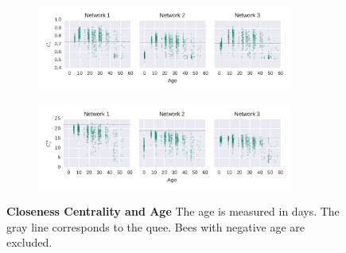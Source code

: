 \begin{figure}[htb]
	\centering
	\begin{subfigure}[b]{1.0\textwidth}
	\centering
	\includegraphics[width=0.92\textwidth]{Figures/stat-closenessAge}
	\label{fig:closenessAgeUW}
	\end{subfigure} 
	\begin{subfigure}[b]{1.0\textwidth}
	\centering
	\includegraphics[width=0.92\textwidth]{Figures/stat-closenessWAge}
	\label{fig:closenessAgeW}
	\end{subfigure}
	\caption[Closeness Centrality and Age]{\textbf{Closeness Centrality and Age} The age is measured in days. The gray line corresponds to the quee. Bees with negative age are excluded.}
	\label{fig:closenessAge}
\end{figure}

